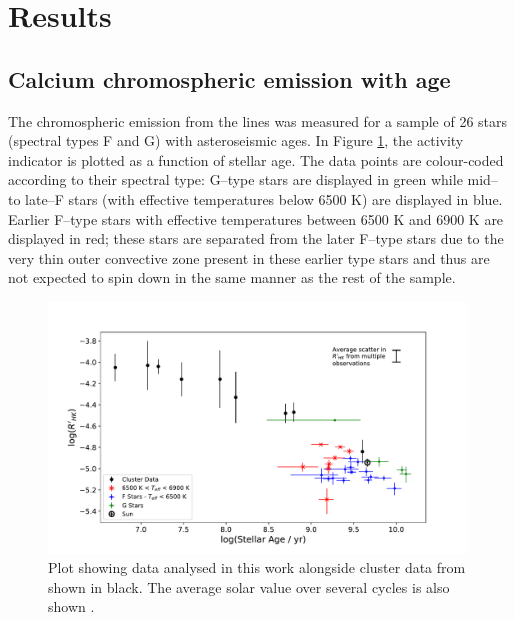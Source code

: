 \section{Results}
\label{Chp4_results}

\subsection{Calcium chromospheric emission with age}
\label{Chp4_results_general_results}
The chromospheric emission from the \caII lines was measured for a sample of 26 stars (spectral types F and G) with asteroseismic ages. In Figure \ref{fig:calcium_emission_plot}, the \Rprime activity indicator is plotted as a function of stellar age. The data points are colour-coded according to their spectral type: G--type stars are displayed in green while mid-- to late--F stars (with effective temperatures below 6500 K) are displayed in blue. Earlier F--type stars with effective temperatures between 6500 K and 6900 K are displayed in red; these stars are separated from the later F--type stars due to the very thin outer convective zone present in these earlier type stars and thus are not expected to spin down in the same manner as the rest of the sample.

\begin{figure}[h]
	\includegraphics[width=0.99\textwidth]{Figures/4-Chromospheric_age/ca_results_with_clusters.pdf}
	\caption[Calcium emission as a function of age for sample and cluster data]{Plot showing data analysed in this work alongside cluster data from \citet{Mamajek_Hillenbrand_2008} shown in black. The average solar value over several cycles is also shown \citep{Egeland_etal_2017}.}
	\centering
	\label{fig:calcium_emission_plot}
\end{figure}

